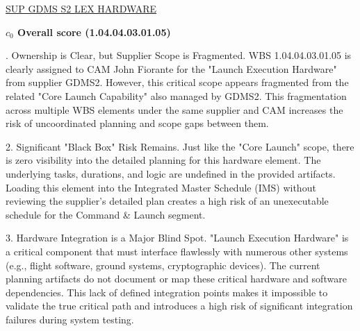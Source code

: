 % 


\begin{frame}{\href{run:../local/source-docs/1.04.04.03.01.05.pdf}{SUP GDMS S2 LEX HARDWARE}}
\centering
{}
\par
\vspace{0.75em}
\textbf{\small{\(c_0\) Overall score {\tiny (1.04.04.03.01.05)}}}\\\par
\vspace{0.5em}
\begin{minipage}{0.85\textwidth}
\raggedright
\fontsize{7}{9}. Ownership is Clear, but Supplier Scope is Fragmented. WBS 1.04.04.03.01.05 is clearly assigned to CAM John Fiorante for the "Launch Execution Hardware" from supplier GDMS2. However, this critical scope appears fragmented from the related "Core Launch Capability" also managed by GDMS2. This fragmentation across multiple WBS elements under the same supplier and CAM increases the risk of uncoordinated planning and scope gaps between them.\par\vspace{0.5em}2. Significant "Black Box" Risk Remains. Just like the "Core Launch" scope, there is zero visibility into the detailed planning for this hardware element. The underlying tasks, durations, and logic are undefined in the provided artifacts. Loading this element into the Integrated Master Schedule (IMS) without reviewing the supplier's detailed plan creates a high risk of an unexecutable schedule for the Command \& Launch segment.\par\vspace{0.5em}3. Hardware Integration is a Major Blind Spot. "Launch Execution Hardware" is a critical component that must interface flawlessly with numerous other systems (e.g., flight software, ground systems, cryptographic devices). The current planning artifacts do not document or map these critical hardware and software dependencies. This lack of defined integration points makes it impossible to validate the true critical path and introduces a high risk of significant integration failures during system testing.\par
\end{minipage}
\end{frame}
